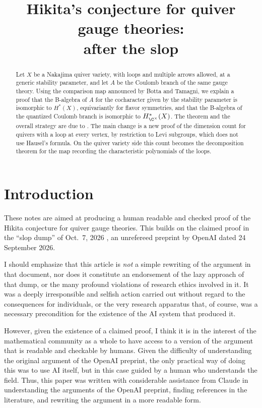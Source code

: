 \documentclass[11pt]{amsart}
\title[Hikita's conjecture for quiver gauge theories]{Hikita's conjecture for quiver gauge theories:\\ after the slop}
\begin{document}
\begin{abstract}
Let $X$ be a Nakajima quiver variety, with loops and multiple arrows
allowed, at a generic stability parameter, and let $A$ be the Coulomb
branch of the same gauge theory.  Using the comparison map announced by
Botta and Tamagni, we explain a proof that the B-algebra of $A$ for the
cocharacter given by the stability parameter is isomorphic to $H^*(X)$,
equivariantly for flavor symmetries, and that the B-algebra of the quantized
Coulomb branch is isomorphic to $H^*_{\C^\times}(X)$.  The theorem and the
overall strategy are due to \cite{openaiEquivariantCohomological2026}.  The main change is a
new proof of the dimension count for quivers with a loop at every vertex, by
restriction to Levi subgroups, which does not use Hausel's formula.  On the
quiver variety side this count becomes the decomposition theorem for the map
recording the characteristic polynomials of the loops.
\end{abstract}

\maketitle

\section{Introduction}\label{sec:intro}

These notes are aimed at producing a human readable and checked proof of the Hikita conjecture for quiver gauge theories.  This builds on the claimed proof in the ``slop dump'' of Oct.\ 7, 2026
 \cite{openaiEquivariantCohomological2026}, an unrefereed
preprint by OpenAI dated 24 September 2026.  

I should emphasize that this article is {\it not} a simple rewriting of the argument in that document, nor does it constitute an endorsement of the lazy approach of that dump, or the many profound violations of research ethics involved in it.  It was a deeply irresponsible and selfish action carried out without regard to the consequences for individuals, or the very research apparatus that, of course, was a necessary precondition for the existence of the AI system that produced it.  

However, given the existence of a claimed proof, I think it is in the interest of the mathematical community as a whole to have access to a version of the argument that is readable and checkable by humans.  Given the difficulty of understanding the original argument of the OpenAI preprint, the only practical way of doing this was to use AI itself, but in this case guided by a human who understands the field.  Thus, this paper was written with considerable assistance from Claude in understanding the arguments of the OpenAI preprint, finding references in the literature, and rewriting the argument in a more readable form.   
\end{document}
